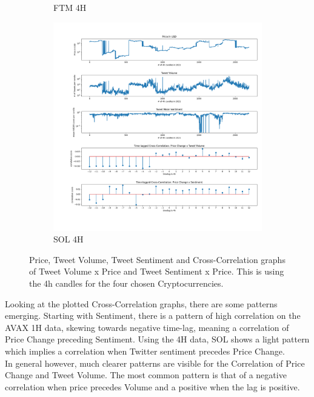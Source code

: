 \documentclass[11pt]{article}
\begin{document}
\begin{figure}[H]
\begin{subfigure}[b]{0.45\textwidth}
         \caption{FTM 4H}
         \label{ftm4h}
     \end{subfigure}
      \hfill 
     \begin{subfigure}[b]{0.45\textwidth}
         \centering
         \includegraphics[width=\textwidth]{figures/crosscorrSOL_4h_range(-12, 13).png}
         \caption{SOL 4H}
         \label{sol4h}
     \end{subfigure}
        \caption{Price, Tweet Volume, Tweet Sentiment and Cross-Correlation graphs of Tweet Volume x Price and Tweet Sentiment x Price. This is using the 4h candles for the four chosen Cryptocurrencies.}
        \label{fig:crosscorr-4h}
\end{figure}

\restoregeometry     %

Looking at the plotted Cross-Correlation graphs, there are some patterns emerging. Starting with Sentiment, there is a pattern of high correlation on the AVAX 1H data, skewing towards negative time-lag, meaning a correlation of Price Change preceding Sentiment. Using the 4H data, SOL shows a light pattern which implies a correlation when Twitter sentiment precedes Price Change.\\
In general however, much clearer patterns are visible for the Correlation of Price Change and Tweet Volume. The most common pattern is that of a negative correlation when price precedes Volume and a positive when the lag is positive.
\end{document}
